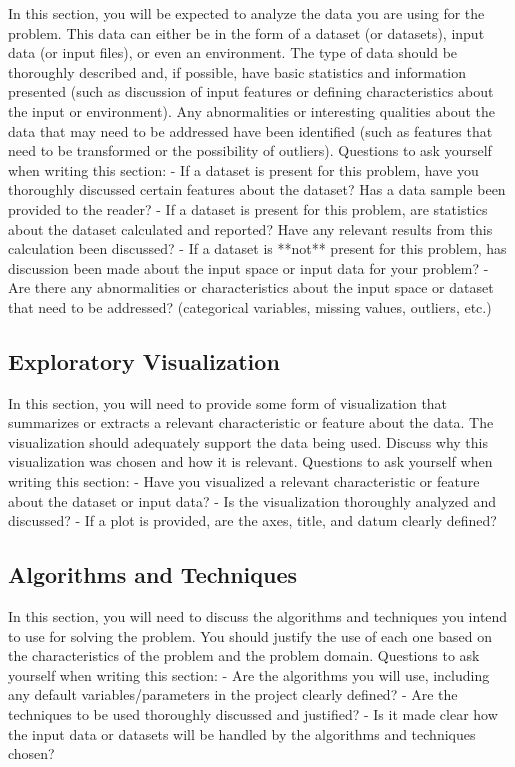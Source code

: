 \documentclass[12pt]{article}
\begin{document}
In this section, you will be expected to analyze the data you are using for the problem. This data can either be in the form of a dataset (or datasets), input data (or input files), or even an environment. The type of data should be thoroughly described and, if possible, have basic statistics and information presented (such as discussion of input features or defining characteristics about the input or environment). Any abnormalities or interesting qualities about the data that may need to be addressed have been identified (such as features that need to be transformed or the possibility of outliers). Questions to ask yourself when writing this section:
- If a dataset is present for this problem, have you thoroughly discussed certain features about the dataset? Has a data sample been provided to the reader?
- If a dataset is present for this problem, are statistics about the dataset calculated and reported? Have any relevant results from this calculation been discussed?
- If a dataset is **not** present for this problem, has discussion been made about the input space or input data for your problem?
- Are there any abnormalities or characteristics about the input space or dataset that need to be addressed? (categorical variables, missing values, outliers, etc.)

\subsection{Exploratory Visualization}
In this section, you will need to provide some form of visualization that summarizes or extracts a relevant characteristic or feature about the data. The visualization should adequately support the data being used. Discuss why this visualization was chosen and how it is relevant. Questions to ask yourself when writing this section:
- Have you visualized a relevant characteristic or feature about the dataset or input data?
- Is the visualization thoroughly analyzed and discussed?
- If a plot is provided, are the axes, title, and datum clearly defined?

\subsection{Algorithms and Techniques}
In this section, you will need to discuss the algorithms and techniques you intend to use for solving the problem. You should justify the use of each one based on the characteristics of the problem and the problem domain. Questions to ask yourself when writing this section:
- Are the algorithms you will use, including any default variables/parameters in the project clearly defined?
- Are the techniques to be used thoroughly discussed and justified?
- Is it made clear how the input data or datasets will be handled by the algorithms and techniques chosen?
\end{document}
